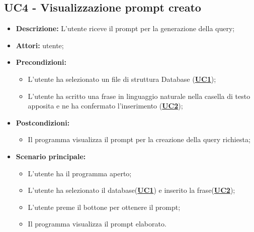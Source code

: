 \documentclass[5pt]{article}
\begin{document}
\subsection{UC4 - Visualizzazione prompt creato}
\label{sec:UC4}
\begin{itemize}
    \item \textbf{Descrizione:} L’utente riceve il prompt per la generazione della query;
    \item \textbf{Attori:} utente;
    \item \textbf{Precondizioni:} 
    \begin{itemize}
        \item L’utente ha selezionato un file di struttura Database (\hyperref[sec:UC1]{\textbf{UC1}});
        \item L’utente ha scritto una frase in linguaggio naturale nella casella di testo apposita e ne ha confermato l’inserimento (\hyperref[sec:UC2]{\textbf{UC2}});
    \end{itemize}
    \item \textbf{Postcondizioni:} 
    \begin{itemize}
        \item Il programma visualizza il prompt per la creazione della query richiesta;
    \end{itemize}
    \item \textbf{Scenario principale:} 
    \begin{itemize}
        \item L’utente ha il programma aperto;
        \item L’utente ha selezionato il database(\hyperref[sec:UC1]{\textbf{UC1}}) e inserito la frase(\hyperref[sec:UC2]{\textbf{UC2}});
        \item L’utente preme il bottone per ottenere il prompt;
        \item Il programma visualizza il prompt elaborato.
    \end{itemize}
\end{itemize}
\end{document}

